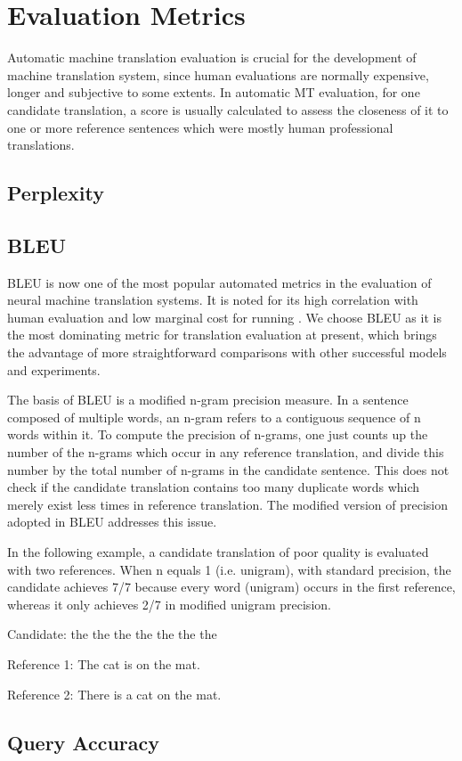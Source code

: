 \cite{tensor2tensor}





\section{Evaluation Metrics}

Automatic machine translation evaluation is crucial for the development of machine translation system, since human evaluations are normally expensive, longer and subjective to some extents. In automatic MT evaluation, for one candidate translation, a score is usually calculated to assess the closeness of it to one or more reference sentences which were mostly human professional translations. 

\subsection{Perplexity}

\subsection{BLEU}

BLEU is now one of the most popular automated metrics in the evaluation of neural machine translation systems. It is noted for its high correlation with human evaluation and low marginal cost for running \cite{Papineni2002}. We choose BLEU as it is the most dominating metric for translation evaluation at present, which brings the advantage of more straightforward comparisons with other successful models and experiments.

The basis of BLEU is a modified n-gram precision measure. In a sentence composed of multiple words, an n-gram refers to a contiguous sequence of n words within it. To compute the precision of n-grams, one just counts up the number of the n-grams which occur in any reference translation, and divide this number by the total number of n-grams in the candidate sentence. This does not check if the candidate translation contains too many duplicate words which merely exist less times in reference translation. The modified version of precision adopted in BLEU addresses this issue. 

In the following example, a candidate translation of poor quality is evaluated with two references. When n equals 1 (i.e. unigram), with standard precision, the candidate achieves 7/7 because every word (unigram) occurs in the first reference, whereas it only achieves 2/7 in modified unigram precision. 

Candidate: the the the the the the the

Reference 1: The cat is on the mat.

Reference 2: There is a cat on the mat.



\subsection{Query Accuracy}


